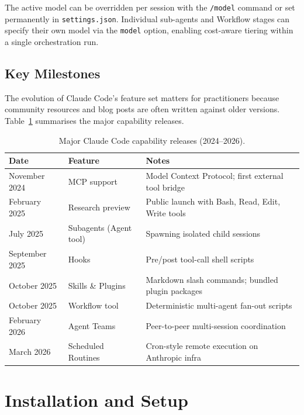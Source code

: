 The active model can be overridden per session with the \texttt{/model} command
or set permanently in \texttt{settings.json}.  Individual sub-agents and
Workflow stages can specify their own model via the \texttt{model} option,
enabling cost-aware tiering within a single orchestration run.

\subsection{Key Milestones}
\label{app:claude-code:milestones}

The evolution of Claude Code's feature set matters for practitioners because
community resources and blog posts are often written against older versions.
Table~\ref{tab:claude-code-milestones} summarises the major capability
releases.

\begin{table}[ht]
\centering
\caption{Major Claude Code capability releases (2024--2026).}
\label{tab:claude-code-milestones}
\begin{tabular}{lll}
\toprule
\textbf{Date} & \textbf{Feature} & \textbf{Notes} \\
\midrule
November 2024 & MCP support & Model Context Protocol; first external tool bridge \\
February 2025 & Research preview & Public launch with Bash, Read, Edit, Write tools \\
July 2025     & Subagents (Agent tool) & Spawning isolated child sessions \\
September 2025 & Hooks & Pre/post tool-call shell scripts \\
October 2025  & Skills \& Plugins & Markdown slash commands; bundled plugin packages \\
October 2025  & Workflow tool & Deterministic multi-agent fan-out scripts \\
February 2026 & Agent Teams & Peer-to-peer multi-session coordination \\
March 2026    & Scheduled Routines & Cron-style remote execution on Anthropic infra \\
\bottomrule
\end{tabular}
\end{table}

\section{Installation and Setup}
\label{app:claude-code:setup}

